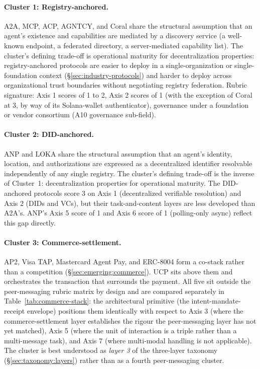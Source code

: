 \paragraph{Cluster 1: Registry-anchored.}
A2A, MCP, ACP, AGNTCY, and Coral share the structural
assumption that an agent's existence and capabilities are
mediated by a discovery service (a well-known endpoint, a
federated directory, a server-mediated capability list).
The cluster's defining trade-off is operational
maturity for decentralization properties: registry-anchored
protocols are easier to deploy in a single-organization or
single-foundation context (\S\ref{sec:industry-protocols})
and harder to deploy across organizational trust
boundaries without negotiating registry federation.
Rubric signature: Axis 1 scores of 1 to 2, Axis 2 scores
of 1 (with the exception of Coral at 3, by way of its
Solana-wallet authenticator), governance under a foundation
or vendor consortium (A10 governance sub-field).

\paragraph{Cluster 2: DID-anchored.}
ANP and LOKA share the structural assumption that an
agent's identity, location, and authorizations are
expressed as a decentralized identifier resolvable
independently of any single registry. The cluster's
defining trade-off is the inverse of Cluster~1:
decentralization properties for operational maturity. The
DID-anchored protocols score 3 on Axis 1 (decentralized
verifiable resolution) and Axis 2 (DIDs and VCs), but
their task-and-content layers are less developed than
A2A's. ANP's Axis 5 score of 1 and Axis 6 score of 1
(polling-only async) reflect this gap directly.

\paragraph{Cluster 3: Commerce-settlement.}
AP2, Visa TAP, Mastercard Agent Pay, and ERC-8004 form a
co-stack rather than a competition (\S\ref{sec:emerging:commerce}).
UCP sits above them and orchestrates the transaction that
surrounds the payment. All five sit outside the
peer-messaging rubric matrix by
design and are compared separately in
Table~\ref{tab:commerce-stack}: the architectural
primitive (the intent-mandate-receipt envelope)
positions them identically with respect to Axis 3 (where
the commerce-settlement layer establishes the rigour the
peer-messaging layer has not yet matched), Axis 5 (where
the unit of interaction is a triple rather than a
multi-message task), and Axis 7 (where multi-modal handling
is not applicable). The cluster is best understood as
\emph{layer 3} of the three-layer taxonomy
(\S\ref{sec:taxonomy:layers}) rather than as a fourth
peer-messaging cluster.

